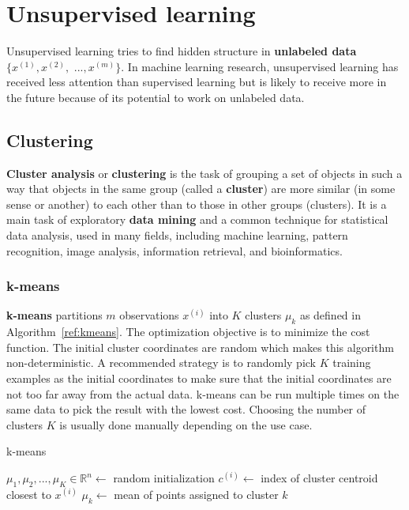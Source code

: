 \documentclass{report}
\begin{document}
\chapter{Unsupervised learning}
Unsupervised learning tries to find hidden structure in {\bf unlabeled data} $\{x^{(1)}, x^{(2)},$ $..., x^{(m)}\}$. In machine learning research, unsupervised learning has received less attention than supervised learning but is likely to receive more in the future because of its potential to work on unlabeled data.

\section{Clustering}
{\bf Cluster analysis} or {\bf clustering} is the task of grouping a set of objects in such a way that objects in the same group (called a {\bf cluster}) are more similar (in some sense or another) to each other than to those in other groups (clusters).
It is a main task of exploratory {\bf data mining} and a common technique for statistical data analysis, used in many fields, including machine learning, pattern recognition, image analysis, information retrieval, and bioinformatics.


\subsection{k-means}
{\bf k-means} partitions $m$ observations $x^{(i)}$ into $K$ clusters $\mu_k$ as defined in Algorithm~\ref{ref:kmeans}. The optimization objective is to minimize the cost function. The initial cluster coordinates are random which makes this algorithm non-deterministic. A recommended strategy is to randomly pick $K$ training examples as the initial coordinates to make sure that the initial coordinates are not too far away from the actual data. k-means can be run multiple times on the same data to pick the result with the lowest cost. Choosing the number of clusters $K$ is usually done manually depending on the use case.

\begin{algorithm}
\caption{k-means}
\label{ref:kmeans}
\begin{algorithmic}
\State $\mu_1, \mu_2, ..., \mu_K \in \mathbb{R}^n \gets$ random initialization
\Repeat
{}
\State $c^{(i)} \gets$ index of cluster centroid closest to $x^{(i)}$
\EndFor
{}
\State $\mu_k \gets$ mean of points assigned to cluster $k$
\EndFor
{}
\end{algorithmic}
\end{algorithm}
\end{document}
